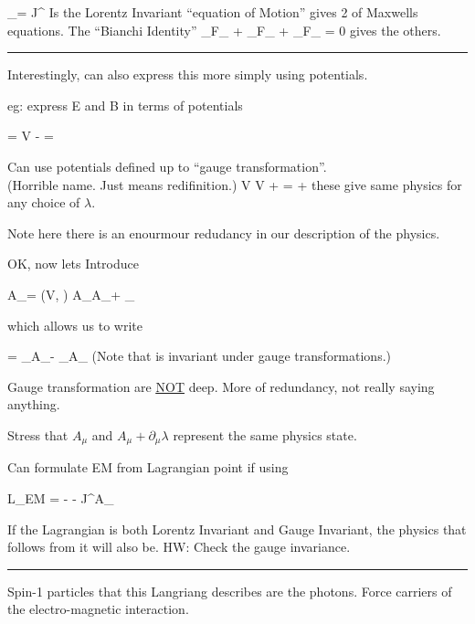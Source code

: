 {\be
\partial_\mu \fMN = J^\nu
\ee
Is the Lorentz Invariant ``equation of Motion'' gives 2 of Maxwells equations. 
The ``Bianchi Identity'' 
\be
\partial_\mu F_{\nu\rho} + \partial_\rho F_{\mu\nu} + \partial_\nu F_{\rho\mu}  = 0 
\ee
gives the others.

\noindent\rule{\textwidth}{1pt}

Interestingly, can also express this more simply using potentials.

eg: express E and B in terms of potentials

\be
{} = \vec{\nabla}V -  \hspace{1in}   = \vec{\nabla} \times {}
\ee


Can use potentials defined up to ``gauge transformation''.\\
(Horrible name. Just means redifinition.) 
\be
V \rightarrow V +  \hspace{1in}   =  + \vec{\nabla} \lambda
\ee
these give same physics for any choice of $\lambda$.

Note here there is an enourmour redudancy in our description of the physics. 

OK, now lets Introduce

\be
A_\mu = (V, ) \hspace{1in} A_\mu \rightarrow A_\mu + \partial_\mu \lambda
\ee

which allows us to write 

\be
\fmn = \partial_\mu A_\nu - \partial_\nu A_\mu
\ee
(Note that \fmn is invariant under gauge transformations.)

Gauge transformation are \underline{\underline{NOT}} deep.  
More of redundancy, not really saying anything. 

Stress that $A_\mu$ and $A_\mu + \partial_\mu \lambda$ represent the same physics state. 

Can formulate EM from Lagrangian point if using 

\be
L_{EM} = - \fmn\fMN - J^\mu A_\mu
\ee

If the Lagrangian is both Lorentz Invariant and Gauge Invariant, the physics that follows from it will also be. 
HW: Check the gauge invariance.

\noindent\rule{\textwidth}{1pt}

Spin-1 particles that this Langriang describes are the photons.  
Force carriers of the electro-magnetic interaction. 

}
